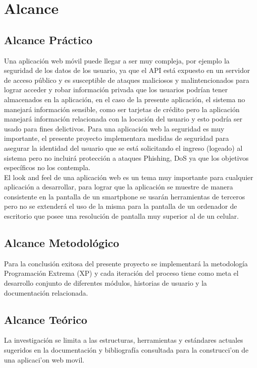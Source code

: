   \section{Alcance}
  \label{sec:Alcance}

    \subsection{Alcance Práctico}
    \label{sub:alcance_practico}
    Una aplicación web móvil puede llegar a ser muy compleja, por ejemplo la seguridad de los datos de los usuario, ya que el API está expuesto en un servidor de acceso público y es susceptible de ataques maliciosos y malintencionados para lograr acceder y robar información privada que los usuarios podrían tener almacenados en la aplicación, en el caso de la presente aplicación, el sistema no manejará información sensible, como ser tarjetas de crédito pero la aplicación manejará información relacionada con la locación del usuario y esto podría ser usado para fines delictivos. Para una aplicación web la seguridad es muy importante, el presente proyecto implementara medidas de seguridad para asegurar la identidad del usuario que se está solicitando el ingreso (logeado) al sistema pero no incluirá protección a ataques Phishing, DoS ya que los objetivos específicos no los contempla.\\


    El look and feel de una aplicación web es un tema muy importante para cualquier aplicación a desarrollar, para lograr que la aplicación se muestre de manera consistente en la pantalla de un smartphone se usarán herramientas de terceros pero no se extenderá el uso de la misma para la pantalla de un ordenador de escritorio que posee una resolución de pantalla muy superior al de un celular.\\




    \subsection{Alcance Metodológico}
    \label{sub:alcance_metodologico}
    Para la conclusión exitosa del presente proyecto se implementará la metodología  Programación Extrema (XP) y cada iteración del proceso tiene como meta el desarrollo conjunto de diferentes módulos, historias de usuario y la documentación relacionada.

    \subsection{Alcance Teórico}
    \label{sub:alcance_teorico}
    La investigación se limita a las estructuras, herramientas y estándares actuales sugeridos en la documentación y bibliografía consultada para la construcci'on de una aplicaci'on web movil.

